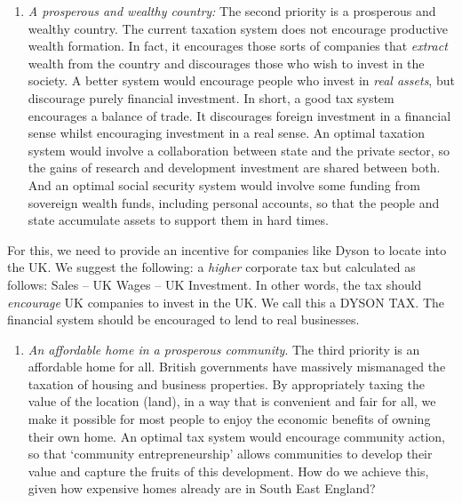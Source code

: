 \documentclass[]{tufte-handout}
\providecommand{\tightlist}{%
  \setlength{\itemsep}{0pt}\setlength{\parskip}{0pt}}
\begin{document}
\begin{enumerate}
\def\labelenumi{\arabic{enumi}.}
\tightlist
\item
  \emph{A prosperous and wealthy country:} The second priority is a
  prosperous and wealthy country. The current taxation system does not
  encourage productive wealth formation. In fact, it encourages those
  sorts of companies that \emph{extract} wealth from the country and
  discourages those who wish to invest in the society. A better system
  would encourage people who invest in \emph{real assets}, but
  discourage purely financial investment. In short, a good tax system
  encourages a balance of trade. It discourages foreign investment in a
  financial sense whilst encouraging investment in a real sense. An
  optimal taxation system would involve a collaboration between state
  and the private sector, so the gains of research and development
  investment are shared between both. And an optimal social security
  system would involve some funding from sovereign wealth funds,
  including personal accounts, so that the people and state accumulate
  assets to support them in hard times.
\end{enumerate}

For this, we need to provide an incentive for companies like Dyson to
locate into the UK. We suggest the following: a \emph{higher} corporate
tax but calculated as follows: Sales -- UK Wages -- UK Investment. In
other words, the tax should \emph{encourage} UK companies to invest in
the UK. We call this a DYSON TAX. The financial system should be
encouraged to lend to real businesses.

\begin{enumerate}
\def\labelenumi{\arabic{enumi}.}
\tightlist
\item
  \emph{An affordable home in a prosperous community}. The third
  priority is an affordable home for all. British governments have
  massively mismanaged the taxation of housing and business properties.
  By appropriately taxing the value of the location (land), in a way
  that is convenient and fair for all, we make it possible for most
  people to enjoy the economic benefits of owning their own home. An
  optimal tax system would encourage community action, so that
  `community entrepreneurship' allows communities to develop their value
  and capture the fruits of this development. How do we achieve this,
  given how expensive homes already are in South East England?
\end{enumerate}
\end{document}

